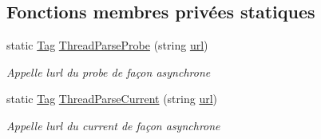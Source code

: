 \subsection*{Fonctions membres privées statiques}
\begin{DoxyCompactItemize}
\item 
static \mbox{\hyperlink{class_m_t_connect_agent_1_1_model_1_1_tag}{Tag}} \mbox{\hyperlink{class_m_t_connect_agent_1_1_user_control_display_tab_ad1fd6a35a00d563b8515f464a3f60afc}{Thread\+Parse\+Probe}} (string \mbox{\hyperlink{class_m_t_connect_agent_1_1_user_control_display_tab_aadac9f472866bf956cae2bd897200e1a}{url}})
\begin{DoxyCompactList}\small\item\em Appelle l\textquotesingle{}url du probe de façon asynchrone \end{DoxyCompactList}\item 
static \mbox{\hyperlink{class_m_t_connect_agent_1_1_model_1_1_tag}{Tag}} \mbox{\hyperlink{class_m_t_connect_agent_1_1_user_control_display_tab_a1035636aa3d4084fdc2b8adde3fe5e3a}{Thread\+Parse\+Current}} (string \mbox{\hyperlink{class_m_t_connect_agent_1_1_user_control_display_tab_aadac9f472866bf956cae2bd897200e1a}{url}})
\begin{DoxyCompactList}\small\item\em Appelle l\textquotesingle{}url du current de façon asynchrone \end{DoxyCompactList}\end{DoxyCompactItemize}
